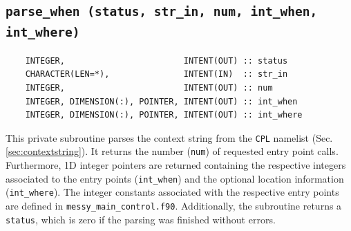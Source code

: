 \documentclass[twoside]{article}
\begin{document}
\subsection{{\tt parse\_when (status, str\_in, num, int\_when, int\_where)}}
\label{sec:pares_when}
%
\begin{verbatim}
    INTEGER,                        INTENT(OUT) :: status
    CHARACTER(LEN=*),               INTENT(IN)  :: str_in
    INTEGER,                        INTENT(OUT) :: num
    INTEGER, DIMENSION(:), POINTER, INTENT(OUT) :: int_when
    INTEGER, DIMENSION(:), POINTER, INTENT(OUT) :: int_where
\end{verbatim}
This private subroutine parses the context string from the {\tt CPL} namelist (Sec. \ref{sec:contextstring}).
It returns the number ({\tt num}) of requested entry point calls. Furthermore, 1D integer pointers are returned containing the respective integers associated to the entry points ({\tt int\_when}) and the optional location information  ({\tt int\_where}).
The integer constants associated with the respective entry points are defined in {\tt messy\_main\_control.f90}.
Additionally, the subroutine returns a {\tt status}, which is zero if the parsing was finished without errors.
%
\end{document}
